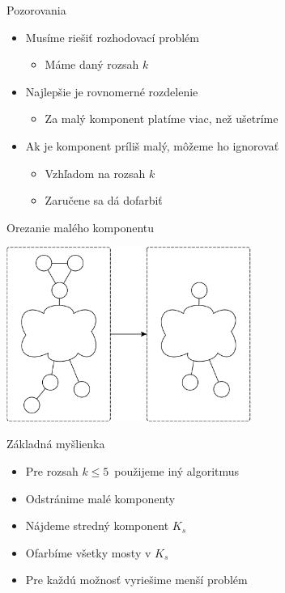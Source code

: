 \documentclass[slovak]{beamer}
\begin{document}
\begin{frame}{Pozorovania}
    \begin{itemize}
        \item Musíme riešiť rozhodovací problém
        \begin{itemize}
            \item Máme daný rozsah $k$
        \end{itemize}
        \item Najlepšie je rovnomerné rozdelenie
        \begin{itemize}
            \item Za malý komponent platíme viac, než ušetríme
        \end{itemize}
        \item Ak je komponent príliš malý, môžeme ho ignorovať
        \begin{itemize}
            \item Vzhľadom na rozsah $k$
            \item Zaručene sa dá dofarbiť
        \end{itemize}
    \end{itemize}
\end{frame}

\begin{frame}{Orezanie malého komponentu}
    \begin{center}
        \includegraphics[width=0.6\textwidth]{grafy/zanedbaj.pdf}
    \end{center}
\end{frame}

\begin{frame}{Základná myšlienka}
    \begin{itemize}
        \item Pre rozsah $k \leq 5$ použijeme iný algoritmus
        \item Odstránime malé komponenty
        \item Nájdeme stredný komponent $K_s$
        \item Ofarbíme všetky mosty v $K_s$
        \item Pre každú možnosť vyriešime menší problém
    \end{itemize}
\end{frame}
\end{document}

